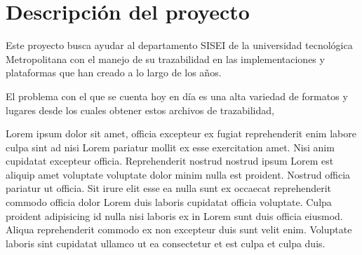 \section{Descripción del proyecto}

Este proyecto busca ayudar al departamento SISEI de la universidad tecnológica Metropolitana con el manejo de su trazabilidad en las implementaciones y plataformas que han creado a lo largo de los años.

El problema con el que se cuenta hoy en día es una alta variedad de formatos y lugares desde los cuales obtener estos archivos de trazabilidad, 


Lorem ipsum dolor sit amet, officia excepteur ex fugiat reprehenderit enim labore culpa sint ad nisi Lorem pariatur mollit ex esse exercitation amet. Nisi anim cupidatat excepteur officia. Reprehenderit nostrud nostrud ipsum Lorem est aliquip amet voluptate voluptate dolor minim nulla est proident. Nostrud officia pariatur ut officia. Sit irure elit esse ea nulla sunt ex occaecat reprehenderit commodo officia dolor Lorem duis laboris cupidatat officia voluptate. Culpa proident adipisicing id nulla nisi laboris ex in Lorem sunt duis officia eiusmod. Aliqua reprehenderit commodo ex non excepteur duis sunt velit enim. Voluptate laboris sint cupidatat ullamco ut ea consectetur et est culpa et culpa duis.

\clearpage
